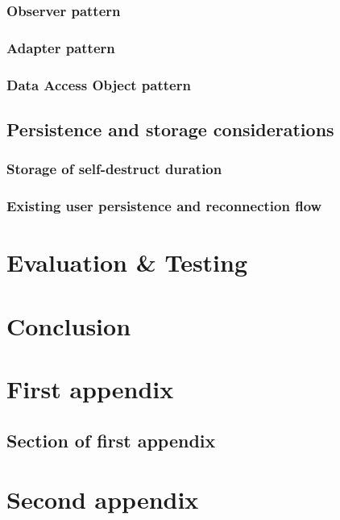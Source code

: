 \documentclass{mproj}
\begin{document}
\subsection{Observer pattern}

\subsection{Adapter pattern}

\subsection{Data Access Object pattern}


\section{Persistence and storage considerations}
\subsection{Storage of self-destruct duration}
\subsection{Existing user persistence and reconnection flow}


\chapter{Evaluation \& Testing}\label{testing}

\chapter{Conclusion}\label{conclusion}

\appendix %
\chapter{First appendix}

\section{Section of first appendix}

\chapter{Second appendix}

\printbibliography
\end{document}
